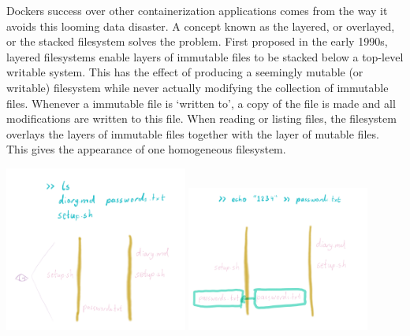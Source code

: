 Dockers success over other containerization applications comes from the way it avoids this looming data disaster.
A concept known as the layered, or overlayed, or the stacked filesystem solves the problem.
First proposed in the early 1990s, layered filesystems enable layers of immutable files to be stacked below a top-level writable system.
This has the effect of producing a seemingly mutable (or writable) filesystem while never actually modifying the collection of immutable files.
Whenever a immutable file is `written to', a copy of the file is made and all modifications are written to this file.
When reading or listing files, the filesystem overlays the layers of immutable files together with the layer of mutable files.
This gives the appearance of one homogeneous filesystem.





    
\begin{drafting}
\includegraphics[width=0.45\textwidth]{docker/images/lfs-list}
\includegraphics[width=0.45\textwidth]{docker/images/lfs-write}
\end{drafting}

